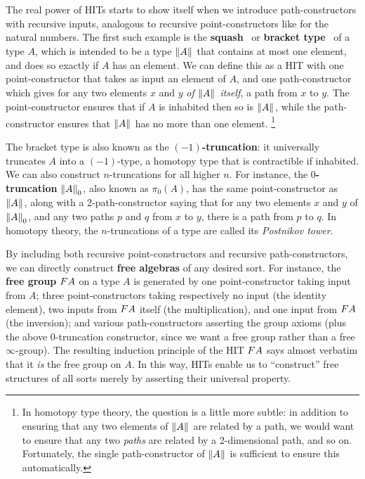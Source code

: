 \documentclass{amsart}
\begin{document}
The real power of HITs starts to show itself when we introduce path-constructors with recursive inputs, analogous to recursive point-constructors like \fsucc for the natural numbers.
The first such example is the \textbf{squash}~\cite{nuprlbook} or \textbf{bracket type}~\cite{ab:bracket-types} of a type $A$, which is intended to be a type $\brck{A}$ that contains at most one element, and does so exactly if $A$ has an element.
We can define this as a HIT with one point-constructor that takes as input an element of $A$, and one path-constructor which gives for any two elements $x$ and $y$ \emph{of $\brck{A}$ itself}, a path from $x$ to $y$.
The point-constructor ensures that if $A$ is inhabited then so is $\brck{A}$, while the path-constructor ensures that $\brck{A}$ has no more than one element.%
\footnote{In homotopy type theory, the question is a little more subtle: in addition to ensuring that any two elements of $\brck{A}$ are related by a path, we would want to ensure that any two \emph{paths} are related by a 2-dimensional path, and so on.
  Fortunately, the single path-constructor of $\brck{A}$ is sufficient to ensure this automatically.}

The bracket type is also known as the \textbf{$(-1)$-truncation}: it universally truncates $A$ into a $(-1)$-type, a homotopy type that is contractible if inhabited.
We can also construct $n$-truncations for all higher $n$.
For instance, the \textbf{$0$-truncation} $\trunc 0 A$, also known as $\pi_0(A)$, has the same point-constructor as $\brck{A}$, along with a 2-path-constructor saying that for any two elements $x$ and $y$ of $\trunc 0 A$, and any two paths $p$ and $q$ from $x$ to $y$, there is a path from $p$ to $q$.
In homotopy theory, the $n$-truncations of a type are called its \emph{Postnikov tower}.

By including both recursive point-constructors and recursive path-constructors, we can directly construct \textbf{free algebras} of any desired sort.
For instance, the \textbf{free group} $\freegroup{A}$ on a type $A$ is generated by one point-constructor taking input from $A$; three point-constructors taking respectively no input (the identity element), two inputs from $\freegroup{A}$ itself (the multiplication), and one input from $\freegroup{A}$ (the inversion); and various path-constructors asserting the group axioms (plus the above 0-truncation constructor, since we want a free group rather than a free $\infty$-group).
The resulting induction principle of the HIT $\freegroup{A}$ says almost verbatim that it \emph{is} the free group on $A$.
In this way, HITs enable us to ``construct'' free structures of all sorts merely by asserting their universal property.
\end{document}
